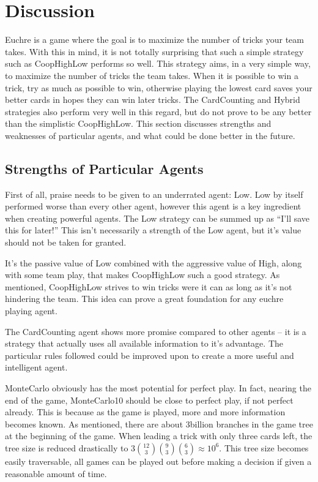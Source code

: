 
\section{Discussion}

Euchre is a game where the goal is to maximize the number of tricks your team takes. With this in mind, it is not
totally surprising that such a simple strategy such as CoopHighLow performs so well. This strategy aims, in a very simple way,
to maximize the number of tricks the team takes. When it is possible to win a trick, try as much as possible to win, otherwise
playing the lowest card saves your better cards in hopes they can win later tricks. The CardCounting and Hybrid strategies also
perform very well in this regard, but do not prove to be any better than the simplistic CoopHighLow. This section discusses
strengths and weaknesses of particular agents, and what could be done better in the future.


\subsection{Strengths of Particular Agents}

First of all, praise needs to be given to an underrated agent: Low. Low by itself performed worse than every other agent, however
this agent is a key ingredient when creating powerful agents. The Low strategy can be summed up as ``I'll save this for later!''
This isn't necessarily a strength of the Low agent, but it's value should not be taken for granted.

It's the passive value of Low combined with the aggressive value of High, along with some team play, that makes CoopHighLow such
a good strategy. As mentioned, CoopHighLow strives to win tricks were it can as long as it's not hindering the team. This idea
can prove a great foundation for any euchre playing agent.

The CardCounting agent shows more promise compared to other agents -- it is a strategy that actually uses all available information
to it's advantage. The particular rules followed could be improved upon to create a more useful and intelligent agent.

MonteCarlo obviously has the most potential for perfect play. In fact, nearing the end of the game, MonteCarlo10 should be close to perfect play,
if not perfect already. This is because as the game is played, more and more information becomes known. As mentioned, there are about 3billion
branches in the game tree at the beginning of the game. When leading a trick with only three cards left, the tree size is reduced drastically to
$3 {12 \choose 3}{9 \choose 3}{6 \choose 3} \approx 10^6$. This tree size becomes easily traversable, all games can be played out before
making a decision if given a reasonable amount of time.


